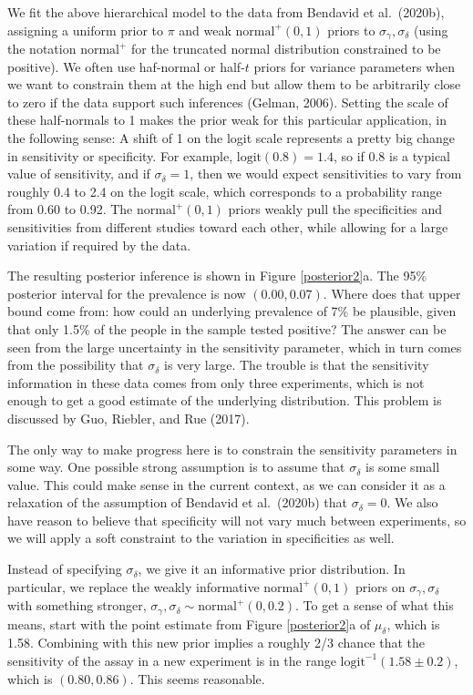\documentclass[11pt]{article}
\begin{document}
We fit the above hierarchical model to the data from Bendavid et al.\
(2020b), assigning a uniform prior to $\pi$ and weak
$\mbox{normal}^+(0,1)$ priors to $\sigma_{\gamma},\sigma_{\delta}$
(using the notation $\mbox{normal}^+$ for the truncated normal
distribution constrained to be positive).  We often use haf-normal or
half-$t$ priors for variance parameters when we want to constrain them
at the high end but allow them to be arbitrarily close to zero if the
data support such inferences (Gelman, 2006).  Setting the scale of
these half-normals to 1 makes the prior weak for this particular
application, in the following sense: A shift of 1 on the logit scale
represents a pretty big change in sensitivity or specificity.  For
example, $\mbox{logit}(0.8)=1.4$, so if 0.8 is a typical value of
sensitivity, and if $\sigma_{\delta}=1$, then we would expect
sensitivities to vary from roughly 0.4 to 2.4 on the logit scale,
which corresponds to a probability range from 0.60 to 0.92.  The
$\mbox{normal}^+(0,1)$ priors weakly pull the specificities and
sensitivities from different studies toward each other, while allowing
for a large variation if required by the data.

The resulting posterior inference is shown in Figure
\ref{posterior2}a.  The 95\% posterior interval for the prevalence is
now $(0.00, 0.07)$.  Where does that upper bound come from: how could
an underlying prevalence of 7\% be plausible, given that only 1.5\% of
the people in the sample tested positive?  The answer can be seen from
the large uncertainty in the sensitivity parameter, which in turn
comes from the possibility that $\sigma_{\delta}$ is very large.  The
trouble is that the sensitivity information in these data comes from
only three experiments, which is not enough to get a good estimate of
the underlying distribution.  This problem is discussed by Guo,
Riebler, and Rue (2017).

The only way to make progress here is to constrain the sensitivity
parameters in some way.  One possible strong assumption is to assume
that $\sigma_{\delta}$ is some small value.  This could make sense in
the current context, as we can consider it as a relaxation of the
assumption of Bendavid et al.\ (2020b) that $\sigma_{\delta} = 0$.  We
also have reason to believe that specificity will not vary much
between experiments, so we will apply a soft constraint to the
variation in specificities as well.

Instead of specifying $\sigma_{\delta}$, we give it an informative
prior distribution.  In particular, we replace the weakly informative
$\mbox{normal}^+(0, 1)$ priors on $\sigma_{\gamma},\sigma_{\delta}$
with something stronger,
$\sigma_{\gamma}, \sigma_{\delta}\sim\mbox{normal}^+(0, 0.2)$.  To get
a sense of what this means, start with the point estimate from Figure
\ref{posterior2}a of $\mu_{\delta}$, which is 1.58. Combining with
this new prior implies a roughly 2/3 chance that the sensitivity of
the assay in a new experiment is in the range
$\mbox{logit}^{-1}(1.58 \pm 0.2)$, which is $(0.80, 0.86)$. This seems
reasonable.
\end{document}
